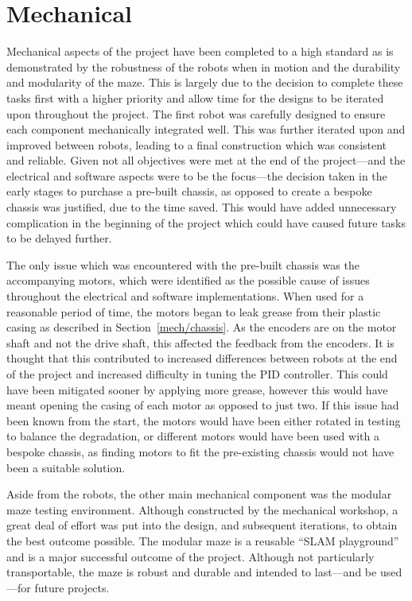\section{Mechanical}\label{eval/mech}
Mechanical aspects of the project have been completed to a
high standard as is demonstrated by the robustness of the robots when in
motion and the durability and modularity of the maze. This is largely due to the
decision to complete these tasks first with a higher priority and allow time for the
designs to be iterated upon throughout the project. The first robot was carefully
designed to ensure each component mechanically integrated well. This was further
iterated upon and improved between robots, leading to a final construction which was
consistent and reliable. Given not all objectives were met at the end of the project---and the electrical and software aspects were to be the focus---the decision taken in the
early stages to purchase a pre-built chassis, as opposed to create a bespoke chassis
was justified, due to the time saved. This would have added unnecessary complication
in the beginning of the project which could have caused future
tasks to be delayed further.

The only issue which was encountered with the pre-built chassis was the
accompanying motors, which were identified as the possible cause of
issues throughout the electrical and software implementations. When used
for a reasonable period of time, the motors began to leak grease from
their plastic casing as described in Section~\ref{mech/chassis}. As the
encoders are on the motor shaft and not the drive shaft, this affected
the feedback from the encoders. It is thought that this contributed to
increased differences between robots at the end of the project and
increased difficulty in tuning the PID controller. This could have been
mitigated sooner by applying more grease, however this would have meant
opening the casing of each motor as opposed to just two. If this issue
had been known from the start, the motors would have been either rotated
in testing to balance the degradation, or different motors would have
been used with a bespoke chassis, as finding motors to fit the pre-existing
chassis would not have been a suitable solution.

Aside from the robots, the other main mechanical component was the modular maze
testing environment. Although constructed by the mechanical workshop, a great deal of
effort was put into the design, and subsequent iterations, to obtain the best outcome
possible. The modular maze is a reusable ``SLAM playground'' and is a major
successful outcome of the project. Although not particularly transportable, the maze
is robust and durable and intended to last---and be used---for future projects.

